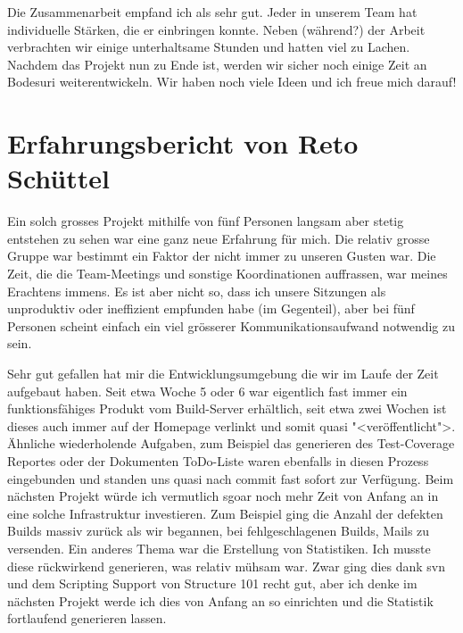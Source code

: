 \documentclass[12pt,halfparskip]{scrartcl}
\begin{document}
Die Zusammenarbeit empfand ich als sehr gut. Jeder in unserem Team hat individuelle Stärken, die er einbringen konnte. Neben (während?) der Arbeit verbrachten wir einige unterhaltsame Stunden und hatten viel zu Lachen. Nachdem das Projekt nun zu Ende ist, werden wir sicher noch einige Zeit an Bodesuri weiterentwickeln. Wir haben noch viele Ideen und ich freue mich darauf!

\section{Erfahrungsbericht von Reto Schüttel}

Ein solch grosses Projekt mithilfe von fünf Personen langsam aber stetig entstehen zu sehen war eine ganz neue Erfahrung für mich. Die relativ grosse Gruppe war bestimmt ein Faktor der nicht immer zu unseren Gusten war. Die Zeit, die die Team-Meetings und sonstige Koordinationen auffrassen, war meines Erachtens immens. Es ist aber nicht so, dass ich unsere Sitzungen als unproduktiv oder ineffizient empfunden habe (im Gegenteil), aber bei fünf Personen scheint einfach ein viel grösserer Kommunikationsaufwand notwendig zu sein.


Sehr gut gefallen hat mir die Entwicklungsumgebung die wir im Laufe der Zeit aufgebaut haben. Seit etwa Woche 5 oder 6 war eigentlich fast immer ein funktionsfähiges Produkt vom Build-Server erhältlich, seit etwa zwei Wochen ist dieses auch immer auf der Homepage verlinkt und somit quasi "<veröffentlicht">.  Ähnliche wiederholende Aufgaben, zum Beispiel das generieren des Test-Coverage Reportes oder der Dokumenten ToDo-Liste waren ebenfalls in diesen Prozess eingebunden und standen uns quasi nach commit fast sofort zur Verfügung. Beim nächsten Projekt würde ich vermutlich sgoar noch mehr Zeit von Anfang an in eine solche Infrastruktur investieren. Zum Beispiel ging die Anzahl der defekten Builds massiv zurück als wir begannen, bei fehlgeschlagenen Builds, Mails zu versenden. Ein anderes Thema war die Erstellung von Statistiken. Ich musste diese rückwirkend generieren, was relativ mühsam war. Zwar ging dies dank svn und dem Scripting Support von Structure 101 recht gut, aber ich denke im nächsten Projekt werde ich dies von Anfang an so einrichten und die Statistik fortlaufend generieren lassen.
\end{document}
